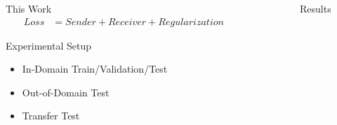 \documentclass[final]{beamer}
\newlength{\sepwid}
\newlength{\onecolwid}
\newlength{\twocolwid}
\begin{document}
\begin{frame}[t]
\begin{columns}[t]
\begin{column}{\onecolwid}
\begin{block}{This Work}
\begin{align*}
Loss &= Sender + Receiver + Regularization
\end{align*}

\end{block}

\begin{block}{Experimental Setup}

\begin{itemize}
\item In-Domain Train/Validation/Test
\item Out-of-Domain Test
\item Transfer Test
\end{itemize}

\end{block}

\end{column} %


\begin{column}{\sepwid}\end{column} %

\begin{column}{\twocolwid} %

\begin{block}{Results}


\end{block}
\end{column}
\end{columns}
\end{frame}
\end{document}
